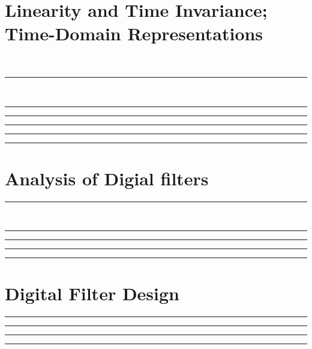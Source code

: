 \documentclass[10pt]{article}
\begin{document}
\newcommand{\josquote}[1]{
    \framebox{
    \parbox{\textwidth}{
    \textit{#1}
    }
    }
}

\newcommand{\paulhint}[1]{
    #1
}

\setlength\parindent{0pt}
\section{Linearity and Time Invariance; Time-Domain Representations}
\\
\noindent\rule[0.5ex]{\linewidth}{0.5pt}
\\
\noindent\rule[0.5ex]{\linewidth}{0.5pt}

\noindent\rule[0.5ex]{\linewidth}{0.5pt}

\noindent\rule[0.5ex]{\linewidth}{0.5pt}

\noindent\rule[0.5ex]{\linewidth}{0.5pt}

\noindent\rule[0.5ex]{\linewidth}{0.5pt}

\section{Analysis of Digial filters}

\noindent\rule[0.5ex]{\linewidth}{0.5pt}
\\
\noindent\rule[0.5ex]{\linewidth}{0.5pt}

\noindent\rule[0.5ex]{\linewidth}{0.5pt}

\noindent\rule[0.5ex]{\linewidth}{0.5pt}

\noindent\rule[0.5ex]{\linewidth}{0.5pt}

\section{Digital Filter Design}

\noindent\rule[0.5ex]{\linewidth}{0.5pt}

\noindent\rule[0.5ex]{\linewidth}{0.5pt}

\noindent\rule[0.5ex]{\linewidth}{0.5pt}

\noindent\rule[0.5ex]{\linewidth}{0.5pt}

\end{document}
